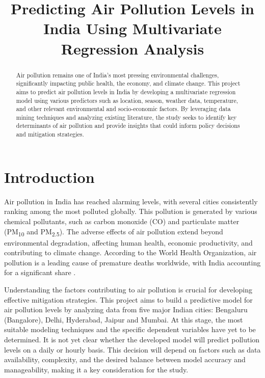 \documentclass[12pt]{article}
\title{Predicting Air Pollution Levels in India Using Multivariate Regression Analysis}
\author{}
\date{}
\begin{document}
\maketitle


\begin{abstract}
Air pollution remains one of India's most pressing environmental challenges, significantly impacting public health, the economy, and climate change. This project aims to predict air pollution levels in India by developing a multivariate regression model using various predictors such as location, season, weather data, temperature, and other relevant environmental and socio-economic factors. By leveraging data mining techniques and analyzing existing literature, the study seeks to identify key determinants of air pollution and provide insights that could inform policy decisions and mitigation strategies.
\end{abstract}

\tableofcontents

\newpage

\section{Introduction}

Air pollution in India has reached alarming levels, with several cities consistently ranking among the most polluted globally. This pollution is generated by various chemical pollutants, such as carbon monoxide (CO) and particulate matter (PM\textsubscript{10} and PM\textsubscript{2.5}). The adverse effects of air pollution extend beyond environmental degradation, affecting human health, economic productivity, and contributing to climate change. According to the World Health Organization, air pollution is a leading cause of premature deaths worldwide, with India accounting for a significant share \cite{Dey2020}.

Understanding the factors contributing to air pollution is crucial for developing effective mitigation strategies. This project aims to build a predictive model for air pollution levels by analyzing data from five major Indian cities: Bengaluru (Bangalore), Delhi, Hyderabad, Jaipur and Mumbai. At this stage, the most suitable modeling techniques and the specific dependent variables have yet to be determined. It is not yet clear whether the developed model will predict pollution levels on a daily or hourly basis. This decision will depend on factors such as data availability, complexity, and the desired balance between model accuracy and manageability, making it a key consideration for the study.
\end{document}

